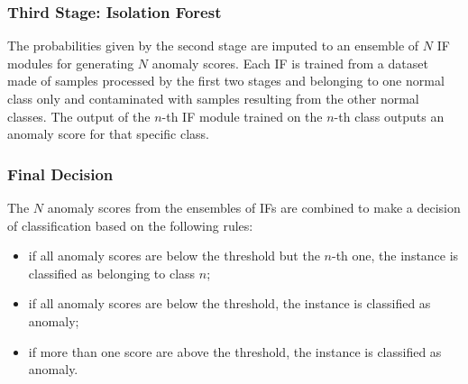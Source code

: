 \subsubsection{Third Stage: Isolation Forest}

The probabilities given by the second stage are imputed to an ensemble of $N$ IF modules for generating $N$ anomaly scores. Each IF is trained from a dataset made of samples processed by the first two stages and belonging to one normal class only and contaminated with samples resulting from the other normal classes. The output of the $n$-th IF module trained on the $n$-th class outputs an anomaly score for that specific class.


\subsubsection{Final Decision}
The $N$ anomaly scores from the ensembles of IFs are combined to make a decision of classification based on the following rules:
\begin{itemize}
  \item if all anomaly scores are below the threshold but the $n$-th one, the instance is classified as belonging to class $n$;
  \item if all anomaly scores are below the threshold, the instance is classified as anomaly;
  \item if more than one score are above the threshold, the instance is classified as anomaly.
\end{itemize}

